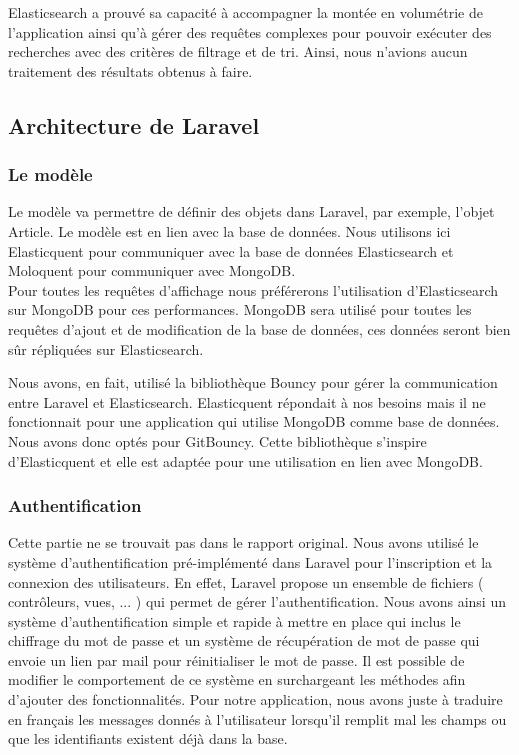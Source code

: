 Elasticsearch a prouvé sa capacité à accompagner la montée en volumétrie de l’application ainsi qu'à gérer des requêtes complexes pour pouvoir exécuter des recherches avec des critères de filtrage et de tri. Ainsi, nous n'avions aucun traitement des résultats obtenus à faire.  

\subsection{Architecture de Laravel}

\subsubsection{Le modèle}

\begin{leftonly}
	Le modèle va permettre de définir des objets dans Laravel, par exemple, l'objet Article. Le modèle est en lien avec la base de données. Nous utilisons ici Elasticquent\cite{GitElasticquent} pour communiquer avec la base de données Elasticsearch et Moloquent\cite{GitLaravelMongo} pour communiquer avec MongoDB.\\ Pour toutes les requêtes d'affichage nous préférerons l'utilisation d'Elasticsearch sur MongoDB pour ces performances. MongoDB sera utilisé pour toutes les requêtes d'ajout et de modification de la base de données, ces données seront bien sûr répliquées sur Elasticsearch.
\end{leftonly}

Nous avons, en fait, utilisé la bibliothèque Bouncy\cite{GitBouncy} pour gérer la communication entre Laravel et Elasticsearch. Elasticquent répondait à nos besoins mais il ne fonctionnait pour une application qui utilise MongoDB comme base de données. Nous avons donc optés pour GitBouncy. Cette bibliothèque s'inspire d'Elasticquent et elle est adaptée pour une utilisation en lien avec MongoDB.

\subsubsection{Authentification}

Cette partie ne se trouvait pas dans le rapport original. Nous avons utilisé le système d'authentification pré-implémenté dans Laravel pour l'inscription et la connexion des utilisateurs. En effet, Laravel propose un ensemble de fichiers ( contrôleurs, vues, ... ) qui permet de gérer l'authentification. Nous avons ainsi un système d'authentification simple et rapide à mettre en place qui inclus le chiffrage du mot de passe et un système de récupération de mot de passe qui envoie un lien par mail pour réinitialiser le mot de passe. Il est possible de modifier le comportement de ce système en surchargeant les méthodes afin d'ajouter des fonctionnalités. Pour notre application, nous avons juste à traduire en français les messages donnés à l'utilisateur lorsqu'il remplit mal les champs ou que les identifiants existent déjà dans la base.

